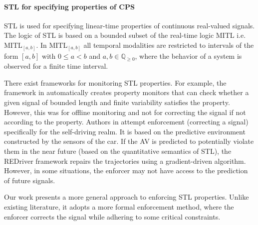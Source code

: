 \paragraph{STL for specifying properties of CPS} STL \cite{10.1007/978-3-540-30206-3_12} is used for specifying linear-time properties of continuous real-valued signals. 
The logic of STL is based on a bounded subset of the real-time logic MITL \cite{10.1145/227595.227602} i.e. MITL$_{[a,b]}$. 
In MITL$_{[a,b]}$ all temporal modalities are restricted to intervals of the form $[a, b]$
with $0 \leq a < b$ and $a, b \in \mathbb{Q}_{\geq 0}$, where the behavior of a system is observed for a finite time interval. 

There exist frameworks for monitoring STL properties. For example, the framework in \cite{10.1007/978-3-540-30206-3_12} automatically creates property monitors that can check whether a given signal of bounded length and finite variability satisfies the property. However, this was for offline monitoring and not for correcting the signal if not according to the property. Authors in \cite{sun2024redriver} attempt enforcement (correcting a signal) specifically for the self-driving realm. %
It is based on the predictive environment constructed by the sensors of the car. If the AV is predicted to potentially violate them in the near future (based on the quantitative semantics of STL), the REDriver framework repairs the trajectories using a gradient-driven algorithm. However, in some situations, the enforcer may not have access to the prediction of future signals.


Our work presents a more general approach to enforcing STL properties. Unlike existing literature, it adopts a more formal enforcement method, where the enforcer corrects the signal while adhering to some critical constraints.

